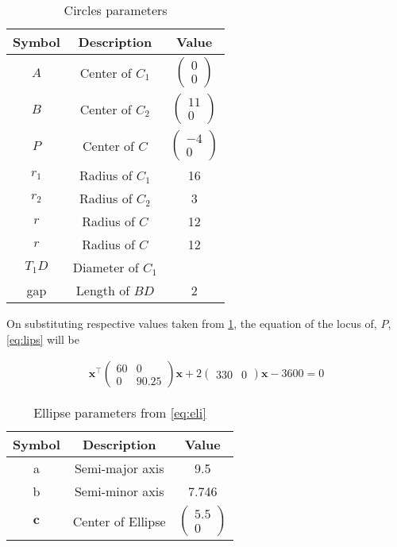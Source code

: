 \documentclass[journal,12pt,twocolumn]{IEEEtran}
\let\vec\mathbf
\newcommand{\myvec}[1]{\ensuremath{\begin{pmatrix}#1\end{pmatrix}}}
\begin{document}
\begin{table}[h!]
		\small
	\centering
	\begin{tabular}[20pt]{|c|c|c|}
		\hline
		\textbf{Symbol}&\textbf{Description}&\textbf{Value}\\
		\hline
			$A$&Center of $C_1$&$\myvec{0\\0}$\\
		\hline
			$B$&Center of $C_2$&$\myvec{11\\0}$\\
		\hline
			$P$&Center of $C$&$\myvec{-4\\0}$\\
		\hline
			$r_1$&Radius of $C_1$&16\\
		\hline 
			$r_2$&Radius of $C_2$&3\\
		\hline 
			$r$&Radius of $C$&12\\
		\hline 
			$r$&Radius of $C$&12\\
		\hline 
			$T_1D$&Diameter of $C_1$&\\
		\hline 
			gap&Length of $BD$&2\\
		\hline 
	\end{tabular}
    \caption{Circles parameters}
	\label{table:1}
\end{table}
On substituting respective values taken from \ref{table:1}, the equation of the locus of, $P$, \eqref{eq:lips} will be

\begin{align}
		\vec{x^{\top}}\myvec{60&0\\0&90.25}\vec{x} + 2\myvec{330&0}\vec{x} - 3600 = 0 \label{eq:eli}
\end{align}

\begin{table}[h!]
	\small
	\centering
	\begin{tabular}[20pt]{|c|c|c|}
		\hline
		\textbf{Symbol}&\textbf{Description}&\textbf{Value}\\
		\hline 
			a&Semi-major axis&9.5\\
		\hline 
			b&Semi-minor axis&7.746\\
		\hline 
			$\vec{c}$&Center of Ellipse&$\myvec{5.5\\0}$\\
		\hline 
	\end{tabular}
		\caption{Ellipse parameters from \eqref{eq:eli}}
	\label{table:2}
\end{table}
\end{document}
